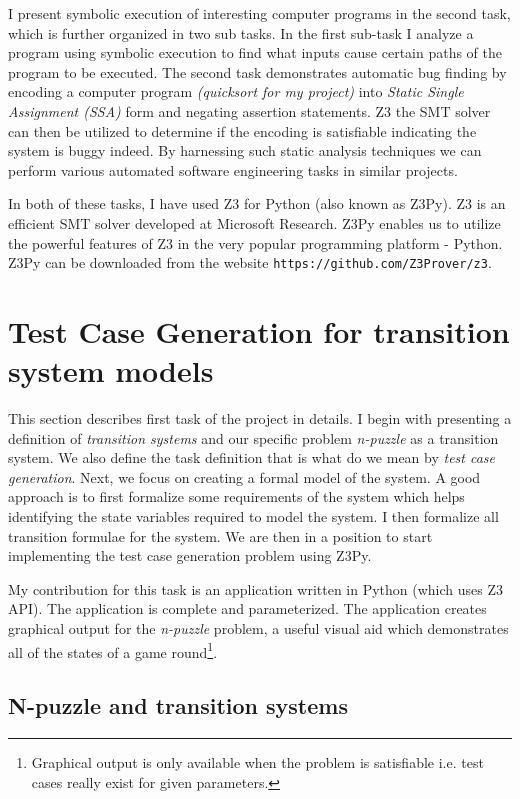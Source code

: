 \documentclass{sig-alternate-05-2015}
\begin{document}
I present symbolic execution of interesting computer programs in the second task, which is further organized in two sub tasks. In the first sub-task I analyze a program using symbolic execution to find what inputs cause certain paths of the program to be executed. The second task demonstrates automatic bug finding by encoding a computer program \textit{(quicksort for my project)} into \textit{Static Single Assignment (SSA)} form and negating assertion statements. Z3 the SMT solver can then be utilized to determine if the encoding is satisfiable indicating the system is buggy indeed. By harnessing such static analysis techniques we can perform various automated software engineering tasks in similar projects.

In both of these tasks, I have used Z3 for Python (also known as Z3Py). Z3 is an efficient SMT solver \cite{DeMoura:Z3} developed at Microsoft Research. Z3Py enables us to utilize the powerful features of Z3 in the very popular programming platform - Python. Z3Py can be downloaded from the website \texttt{https://github.com/Z3Prover/z3}.

\section{Test Case Generation for transition system models}

This section describes first task of the project in details. I begin
with presenting a definition of \textit{transition systems} and our
specific problem \textit{n-puzzle} as a transition system. We also
define the task definition that is what do we mean by \textit{test 
case generation}. Next, we focus on creating a formal model of the 
system. A good approach is to first formalize some requirements
of the system which helps identifying the state variables required
to model the system. I then formalize all transition formulae for 
the system. We are then in a position to start implementing the
test case generation problem using Z3Py.

My contribution for this task is an application written in Python 
(which uses Z3 API). The application is complete and parameterized.
The application creates graphical output for the \textit{n-puzzle}
problem, a useful visual aid which demonstrates all of the states
of a game round\footnote{Graphical output is only available when the 
problem is satisfiable i.e. test cases really exist for given parameters.}.  

\subsection{{\subsecit N-puzzle} and transition systems}
\end{document}
